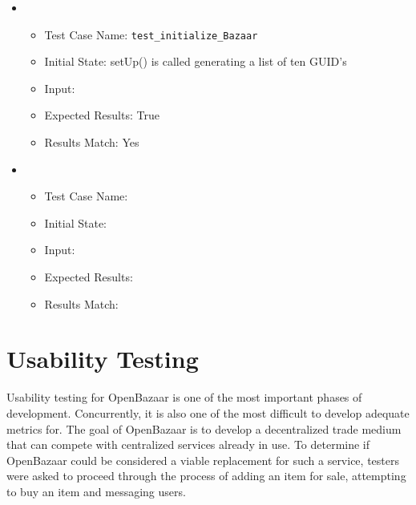 \documentclass{article}
\begin{document}
\begin{itemize}
\item
\begin{itemize}
\item Test Case Name: \texttt{test\_initialize\_Bazaar}
\item Initial State: setUp() is called generating a list of ten GUID's
\item Input:
\item Expected Results: True
\item Results Match: Yes\newline
\end{itemize}
\end{itemize}

\begin{itemize}
\item
\begin{itemize}
\item Test Case Name:
\item Initial State:
\item Input:
\item Expected Results:
\item Results Match:
\end{itemize}
\end{itemize}

\section{Usability Testing}
Usability testing for OpenBazaar is one of the most important phases of development. Concurrently, it is also one of the most difficult to develop adequate metrics for. The goal of OpenBazaar is to develop a decentralized trade medium that can compete with centralized services already in use. \cite{reqs_doc} To determine if OpenBazaar could be considered a viable replacement for such a service, testers were asked to proceed through the process of adding an item for sale, attempting to buy an item and messaging users.
\end{document}
